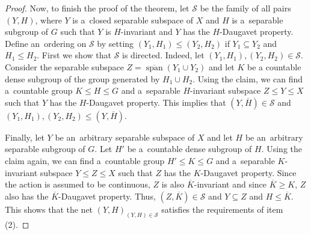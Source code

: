 \documentclass[a4paper,12pt]{amsart}
\theoremstyle{definition}
\theoremstyle{definition}
\theoremstyle{remark}
\numberwithin{equation}{section}
\renewcommand{\geq}{\geqslant}
\renewcommand{\leq}{\leqslant}
\newcommand{\<}{\langle}
\renewcommand{\>}{\rangle}
\newcommand{\clspan}{\overline{\operatorname{span}}}
\begin{document}
\begin{proof}
		Now, to finish the proof of the theorem, let $\mathcal{S}$ be the family of all pairs $(Y,H)$, where $Y$ is a~closed separable subspace of $X$ and $H$ is a~separable subgroup of $G$ such that $Y$ is $H$-invariant and $Y$ has the $H$-Daugavet property.
		Define an~ordering on $\mathcal{S}$ by setting $(Y_1, H_1) \leq (Y_2, H_2)$ if $Y_1 \subseteq Y_2$ and $H_1 \leq H_2$.
		First we show that $\mathcal{S}$ is directed. Indeed, let $(Y_1, H_1), (Y_2, H_2) \in \mathcal{S}$. Consider the separable subspace $Z = \clspan(Y_1 \cup Y_2)$ and let $K$ be a countable dense subgroup of the  group generated by $H_1 \cup H_2$. Using the claim, we can find a~countable group $K \leq H \leq G$ and a~separable $H$-invariant subspace $Z \leq Y \leq X$ such that $Y$ has the $H$-Daugavet property. This implies that $(Y, \overline{H}) \in \mathcal{S}$ and $(Y_1, H_1), (Y_2, H_2) \leq (Y, \overline{H})$.
		
		Finally, let $Y$ be an~arbitrary separable subspace of $X$ and let $H$ be an~arbitrary separable subgroup of $G$. Let $H'$ be a~countable dense subgroup of $H$. Using the claim again, we can find a~countable group $H' \leq K \leq G$ and a~separable $K$-invariant subspace $Y \leq Z \leq X$ such that $Z$ has the $K$-Daugavet property. Since the action is assumed to be continuous, $Z$ is also $\overline{K}$-invariant and since $\overline{K} \geq K$, $Z$ also has the $\overline{K}$-Daugavet property.
		Thus, $(Z, \overline{K}) \in \mathcal{S}$ and $Y \subseteq Z$ and $H \leq \overline{K}$.
		This shows that the net $(Y, H)_{(Y,H) \in \mathcal{S}}$ satisfies the requirements of item (2).
	\end{proof}
	
\end{document}

